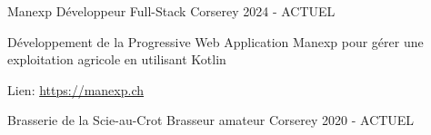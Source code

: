 

\begin{cventries}

    \cventry
    {Manexp} %
    {Développeur Full-Stack} %
    {Corserey} %
    {2024 - ACTUEL} %
    {
      \begin{cvitems} %
        \item {Développement de la Progressive Web Application Manexp pour gérer une exploitation agricole en utilisant Kotlin}
        \item {Lien: \href{https://manexp.ch}{https://manexp.ch}}
      \end{cvitems}
    }

    \cventry
    {Brasserie de la Scie-au-Crot} %
    {Brasseur amateur} %
    {Corserey} %
    {2020 - ACTUEL} %
    {}

\end{cventries}

